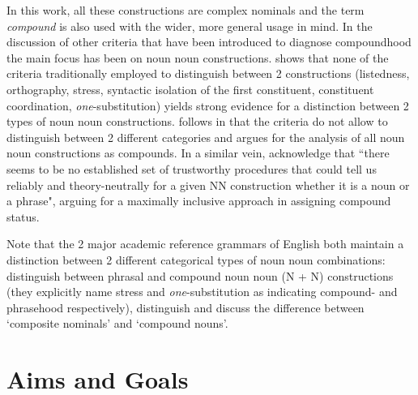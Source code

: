 In this work, all these constructions are complex nominals and the
term \emph{compound} is also used with the wider, more general usage in
mind. In the
discussion of other criteria that have been introduced to diagnose
compoundhood the main focus has been on noun noun constructions. \citet{Bauer:1998} shows that none of the criteria traditionally employed to distinguish between 2 constructions (listedness, orthography, stress, syntactic isolation of the
first constituent, constituent coordination, \emph{one}-substitution)
yields strong evidence for a distinction between 2 types of noun noun
constructions. \citet{Bell:2011} follows \citet{Bauer:1998} in that
the criteria do not allow to distinguish between 2 different
categories and argues for
the analysis of all noun noun constructions as compounds. In a similar vein,
\citet[434]{Baueretal:2013} acknowledge that ``there seems to be no
established set of trustworthy procedures that could tell us reliably
and theory-neutrally for a given NN construction whether it is a noun
or a phrase", arguing for a maximally inclusive approach in assigning
compound status.

Note that the 2 major academic reference grammars of English both
maintain a distinction between 2 different categorical types of noun noun combinations: \citet[1332]{Quirketal:1985} distinguish between phrasal
and compound noun noun (N + N) constructions (they explicitly name stress and
\emph{one}-substitution as indicating compound- and phrasehood respectively), \citet[448--451]{HuddlestonandPullum:2002} distinguish and
discuss the difference between `composite nominals' and `compound
nouns'.

\section{Aims and Goals}
\label{sec:aims_goals}


